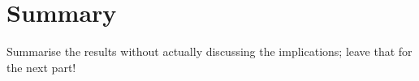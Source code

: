
\section{Summary}
Summarise the results without actually discussing the implications; leave that for the next part!